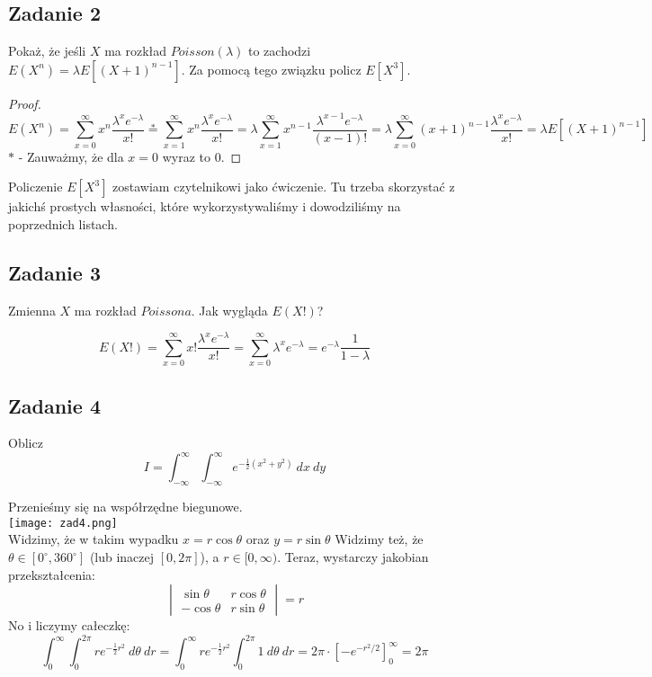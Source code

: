 \documentclass[a4paper]{article}
\begin{document}
\subsection*{Zadanie 2}
Pokaż, że jeśli $X$ ma rozkład $Poisson(\lambda)$ to zachodzi $E(X^n)=\lambda E[(X+1)^{n-1}]$. Za pomocą tego związku policz $E[X^3]$.

\begin{proof}
$$E(X^n)=\sum\limits_{x=0}^{\infty} x^n \frac{\lambda^x e^{-\lambda}}{x!} \stackrel{*}{=} \sum\limits_{x=1}^{\infty} x^n \frac{\lambda^{x} e^{-\lambda}}{x!} = \lambda \sum\limits_{x=1}^{\infty} x^{n-1} \frac{\lambda^{x-1} e^{-\lambda}}{(x-1)!} =\lambda \sum\limits_{x=0}^{\infty} (x+1)^{n-1} \frac{\lambda^{x} e^{-\lambda}}{x!}=\lambda E[(X+1)^{n-1}]$$
$*$ - Zauważmy, że dla $x=0$ wyraz to $0$.
\end{proof}

Policzenie $E[X^3]$ zostawiam czytelnikowi jako ćwiczenie. Tu trzeba skorzystać z jakichś prostych własności, które wykorzystywaliśmy i dowodziliśmy na poprzednich listach.

\subsection*{Zadanie 3}
Zmienna $X$ ma rozkład $Poissona$. Jak wygląda $E(X!)$?

$$E(X!)=\sum_{x=0}^\infty x! \frac{\lambda^x e^{-\lambda}}{x!} =\sum_{x=0}^\infty \lambda^x e^{-\lambda} =e^{-\lambda} \frac{1}{1-\lambda}$$

\subsection*{Zadanie 4}
Oblicz $$I=\int_{-\infty}^{\infty}\int_{-\infty}^{\infty} e^{-\frac{1}{2}(x^2+y^2)}\ dx\ dy$$

Przenieśmy się na współrzędne biegunowe.\\
\texttt{[image: zad4.png]}\\
Widzimy, że w takim wypadku $x=r\cos{\theta}$ oraz $y=r\sin{\theta}$ Widzimy też, że $\theta \in [0^\circ,360^\circ]$ (lub inaczej $[0,2\pi]$), a $r \in [0,\infty)$. Teraz, wystarczy jakobian przekształcenia:
$$\begin{vmatrix}
\sin{\theta} & r\cos{\theta}\\
-\cos{\theta} & r\sin{\theta}
\end{vmatrix}=r $$
No i liczymy całeczkę:\\
$$\int_0^\infty \int_0^{2\pi} re^{-\frac{1}{2}r^2}\ d\theta\ dr = \int_0^\infty  re^{-\frac{1}{2}r^2} \int_0^{2\pi} 1 \ d\theta\ dr =  2\pi \cdot \left[-e^{-r^2/2}\right]_0^\infty = 2\pi$$
\end{document}
